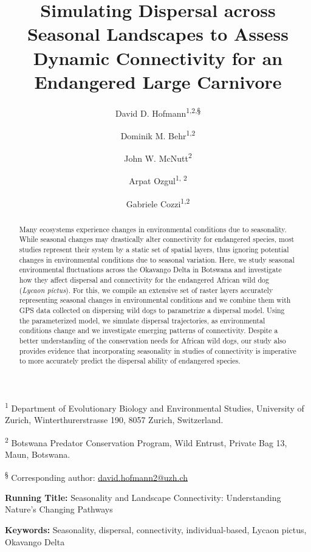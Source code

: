 \documentclass[abstract=on,10pt,a4paper,bibliography=totocnumbered]{article}
\title{Simulating Dispersal across Seasonal Landscapes to Assess Dynamic
Connectivity for an Endangered Large Carnivore}
\author{
  David D. Hofmann\textsuperscript{1,2,\S} \orcid{0000-0003-3477-4365} \and
  Dominik M. Behr\textsuperscript{1,2} \orcid{0000-0001-7378-8538} \and
  John W. McNutt\textsuperscript{2} \and
  Arpat Ozgul\textsuperscript{1, 2} \orcid{0000-0001-7477-2642} \and
  Gabriele Cozzi\textsuperscript{1,2} \orcid{0000-0002-1744-1940}
}
\begin{document}

\maketitle

\begin{flushleft}

\vspace{0.5cm}

\textsuperscript{1} Department of Evolutionary Biology and Environmental
Studies, University of Zurich, Winterthurerstrasse 190, 8057 Zurich,
Switzerland.

\textsuperscript{2} Botswana Predator Conservation Program, Wild Entrust,
Private Bag 13, Maun, Botswana.

\textsuperscript{\S} Corresponding author: \href{mailto://david.hofmann2@uzh.ch}{david.hofmann2@uzh.ch}

\vspace{4cm}

\textbf{Running Title:} Seasonality and Landscape Connectivity: Understanding
Nature's Changing Pathways

\vspace{0.5cm}

\textbf{Keywords:} Seasonality, dispersal, connectivity, individual-based,
Lycaon pictus, Okavango Delta

\end{flushleft}

\newpage
\begin{abstract}

Many ecosystems experience changes in environmental conditions due to
seasonality. While seasonal changes may drastically alter connectivity for
endangered species, most studies represent their system by a static set of
spatial layers, thus ignoring potential changes in environmental conditions due
to seasonal variation. Here, we study seasonal environmental fluctuations
across the Okavango Delta in Botswana and investigate how they affect dispersal
and connectivity for the endangered African wild dog (\textit{Lycaon pictus}).
For this, we compile an extensive set of raster layers accurately representing
seasonal changes in environmental conditions and we combine them with GPS data
collected on dispersing wild dogs to parametrize a dispersal model. Using the
parameterized model, we simulate dispersal trajectories, as environmental
conditions change and we investigate emerging patterns of connectivity. Despite
a better understanding of the conservation needs for African wild dogs, our
study also provides evidence that incorporating seasonality in studies of
connectivity is imperative to more accurately predict the dispersal ability of
endangered species.

\end{abstract}
\end{document}
